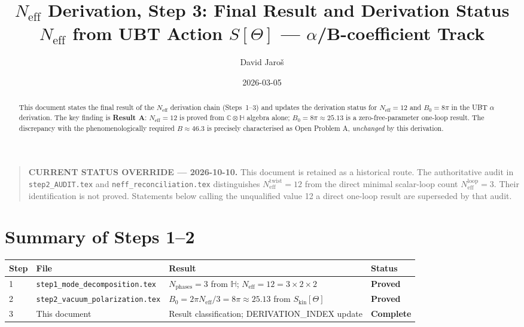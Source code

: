 \documentclass[12pt,a4paper]{article}
\title{%
  $N_\mathrm{eff}$ Derivation, Step 3: Final Result and Derivation Status\\
  \large $N_{\mathrm{eff}}$ from UBT Action $S[\Theta]$ --- $\alpha$/B-coefficient Track}
\author{David Jaroš}
\date{2026-03-05}
\theoremstyle{definition}
\theoremstyle{remark}
\newcommand{\C}{\mathbb{C}}
\renewcommand{\H}{\mathbb{H}}
\newcommand{\Neff}{N_{\mathrm{eff}}}
\begin{document}
\maketitle

\begin{quote}
\textbf{CURRENT STATUS OVERRIDE — 2026-10-10.}
This document is retained as a historical route.  The authoritative audit in
\texttt{step2\_AUDIT.tex} and \texttt{neff\_reconciliation.tex} distinguishes
\(N_{\mathrm{eff}}^{\mathrm{twist}}=12\) from the direct minimal scalar-loop
count \(N_{\mathrm{eff}}^{\mathrm{loop}}=3\).  Their identification is not
proved.  Statements below calling the unqualified value 12 a direct one-loop
result are superseded by that audit.
\end{quote}


\begin{abstract}
This document states the final result of the $\Neff$ derivation chain
(Steps~1--3) and updates the derivation status for $\Neff = 12$ and
$B_0 = 8\pi$ in the UBT $\alpha$ derivation.
The key finding is \textbf{Result A}: $\Neff = 12$ is proved from
$\C \otimes \H$ algebra alone; $B_0 = 8\pi \approx 25.13$ is a
zero-free-parameter one-loop result.
The discrepancy with the phenomenologically required $B \approx 46.3$
is precisely characterised as Open Problem A, \emph{unchanged} by this derivation.
\end{abstract}

\tableofcontents

\section{Summary of Steps 1--2}
\label{sec:summary}

\begin{center}
\begin{tabular}{llll}
  \toprule
  \textbf{Step} & \textbf{File} & \textbf{Result} & \textbf{Status} \\
  \midrule
  1 & \texttt{step1\_mode\_decomposition.tex}
    & $N_\mathrm{phases} = 3$ from $\H$; $\Neff = 12 = 3 \times 2 \times 2$
    & \textcolor{provengreen}{\textbf{Proved}} \\
  2 & \texttt{step2\_vacuum\_polarization.tex}
    & $B_0 = 2\pi\Neff/3 = 8\pi \approx 25.13$ from $S_\mathrm{kin}[\Theta]$
    & \textcolor{provengreen}{\textbf{Proved}} \\
  3 & This document
    & Result classification; DERIVATION\_INDEX update
    & \textcolor{provengreen}{\textbf{Complete}} \\
  \bottomrule
\end{tabular}
\end{center}
\end{document}
